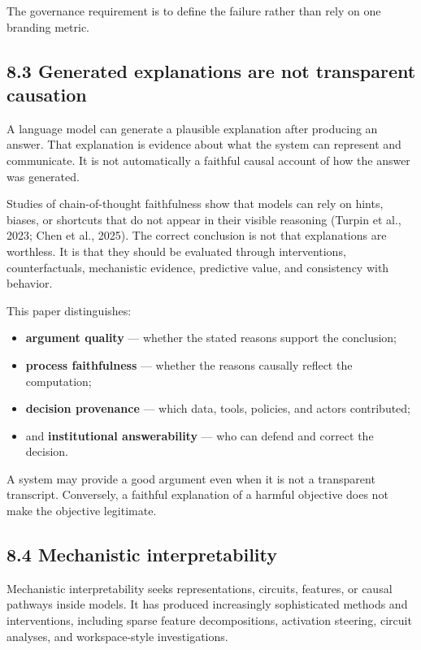 \documentclass[
  11pt,
]{article}
\providecommand{\tightlist}{%
  \setlength{\itemsep}{0pt}\setlength{\parskip}{0pt}}
\begin{document}
The governance requirement is to define the failure rather than rely on
one branding metric.

\subsection{8.3 Generated explanations are not transparent
causation}\label{generated-explanations-are-not-transparent-causation}

A language model can generate a plausible explanation after producing an
answer. That explanation is evidence about what the system can represent
and communicate. It is not automatically a faithful causal account of
how the answer was generated.

Studies of chain-of-thought faithfulness show that models can rely on
hints, biases, or shortcuts that do not appear in their visible
reasoning (Turpin et al., 2023; Chen et al., 2025). The correct
conclusion is not that explanations are worthless. It is that they
should be evaluated through interventions, counterfactuals, mechanistic
evidence, predictive value, and consistency with behavior.

This paper distinguishes:

\begin{itemize}
\tightlist
\item
  \textbf{argument quality} --- whether the stated reasons support the
  conclusion;
\item
  \textbf{process faithfulness} --- whether the reasons causally reflect
  the computation;
\item
  \textbf{decision provenance} --- which data, tools, policies, and
  actors contributed;
\item
  and \textbf{institutional answerability} --- who can defend and
  correct the decision.
\end{itemize}

A system may provide a good argument even when it is not a transparent
transcript. Conversely, a faithful explanation of a harmful objective
does not make the objective legitimate.

\subsection{8.4 Mechanistic
interpretability}\label{mechanistic-interpretability}

Mechanistic interpretability seeks representations, circuits, features,
or causal pathways inside models. It has produced increasingly
sophisticated methods and interventions, including sparse feature
decompositions, activation steering, circuit analyses, and
workspace-style investigations.
\end{document}
